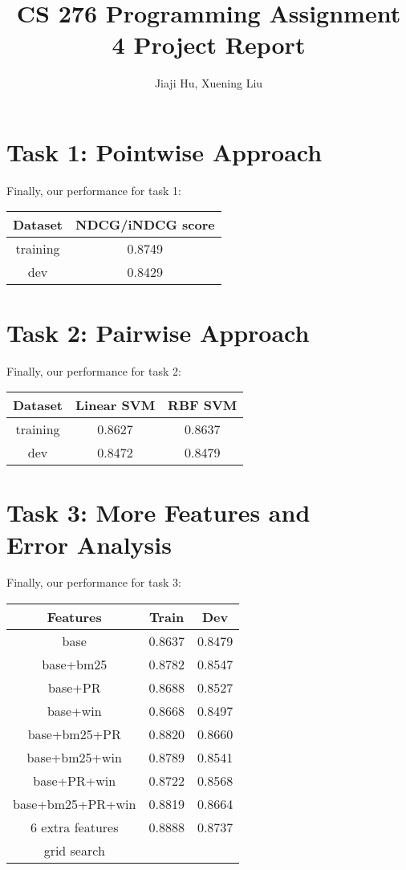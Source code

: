 \documentclass[10pt,twocolumn]{article}
\begin{document}
\title{CS 276 Programming Assignment 4 Project Report}
\author{Jiaji Hu, Xuening Liu}
\date{}
\maketitle

\section*{Task 1: Pointwise Approach}
Finally, our performance for task 1:
\begin{table}[H]
\centering
\begin{tabular}{|c|c|}
\hline
Dataset & NDCG/iNDCG score \\\hline
training & 0.8749\\\hline
dev & 0.8429\\\hline
\end{tabular}
\end{table}

\section*{Task 2: Pairwise Approach}
Finally, our performance for task 2:
\begin{table}[H]
\centering
\begin{tabular}{|c|c|c|}
\hline
Dataset & Linear SVM & RBF SVM \\\hline
training & 0.8627 & 0.8637 \\\hline
dev & 0.8472 & 0.8479\\\hline
\end{tabular}
\end{table}

\section*{Task 3: More Features and \\Error Analysis}
Finally, our performance for task 3:
\begin{table}[H]
\centering
\begin{tabular}{|c|c|c|}
\hline
Features &Train& Dev \\\hline
base & 0.8637 & 0.8479\\\hline
base+bm25 & 0.8782 & 0.8547\\\hline
base+PR & 0.8688 & 0.8527\\\hline
base+win & 0.8668 & 0.8497\\\hline
base+bm25+PR & 0.8820 & 0.8660\\\hline
base+bm25+win & 0.8789 & 0.8541\\\hline
base+PR+win & 0.8722 & 0.8568\\\hline
base+bm25+PR+win & 0.8819 & 0.8664\\\hline
6 extra features & 0.8888 & 0.8737\\\hline
grid search &  & \\\hline
\end{tabular}
\end{table}
\end{document}
